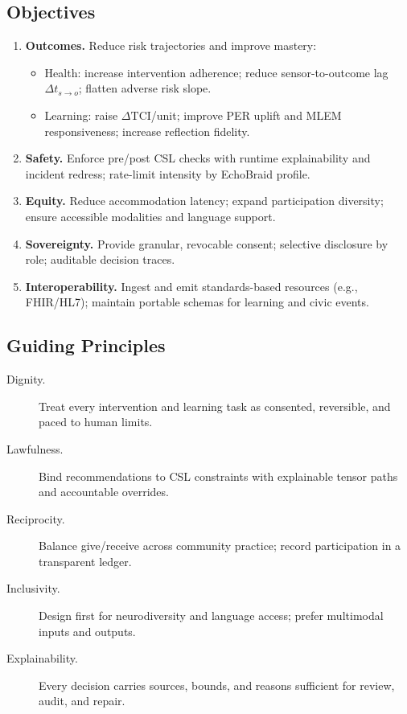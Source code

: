 \documentclass[11pt]{article}
\theoremstyle{plain}
\begin{document}
\subsection{Objectives}
\begin{enumerate}
  \item \textbf{Outcomes.} Reduce risk trajectories and improve mastery:
    \begin{itemize}
      \item Health: increase intervention adherence; reduce sensor-to-outcome lag $\Delta t_{s\to o}$; flatten adverse risk slope.
      \item Learning: raise $\Delta \mathrm{TCI}$/unit; improve PER uplift and MLEM responsiveness; increase reflection fidelity.
    \end{itemize}
  \item \textbf{Safety.} Enforce pre/post CSL checks with runtime explainability and incident redress; rate-limit intensity by EchoBraid profile.
  \item \textbf{Equity.} Reduce accommodation latency; expand participation diversity; ensure accessible modalities and language support.
  \item \textbf{Sovereignty.} Provide granular, revocable consent; selective disclosure by role; auditable decision traces.
  \item \textbf{Interoperability.} Ingest and emit standards-based resources (e.g., FHIR/HL7); maintain portable schemas for learning and civic events.
\end{enumerate}

\subsection{Guiding Principles}
\begin{description}
  \item[Dignity.] Treat every intervention and learning task as consented, reversible, and paced to human limits.
  \item[Lawfulness.] Bind recommendations to CSL constraints with explainable tensor paths and accountable overrides.
  \item[Reciprocity.] Balance give/receive across community practice; record participation in a transparent ledger.
  \item[Inclusivity.] Design first for neurodiversity and language access; prefer multimodal inputs and outputs.
  \item[Explainability.] Every decision carries sources, bounds, and reasons sufficient for review, audit, and repair.
\end{description}
\end{document}

